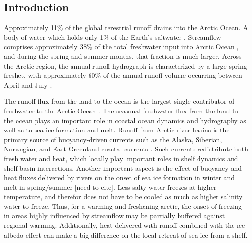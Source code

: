 \documentclass[jgrga, draft]{agutex}
\begin{document}
%

\begin{article}

%
%

\section{Introduction}

Approximately 11\% of the global terestrial runoff drains into the Arctic Ocean.
A body of water which holds only 1\% of the Earth's saltwater \citep{Lewis_2000,Lammers_2001}.
Streamflow comprises approximately 38\% of the total freshwater input into Arctic Ocean \citep{Serreze_2006}, and during the spring and summer months, that fraction is much larger.
Across the Arctic region, the annual runoff hydrograph is characterized by a large spring freshet, with approximately 60\% of the annual runoff volume occurring between April and July \citep{Lammers_2001}.

The runoff flux from the land to the ocean is the largest single contributor of freshwater to the Arctic Ocean \citep{Serreze_2006}.
The seasonal freshwater flux from the land to the ocean plays an important role in coastal ocean dynamics and hydrography \citep{Rabe_2011,Fichot_2013} as well as to sea ice formation and melt.
Runoff from Arctic river basins is the primary source of buoyancy-driven currents such as the Alaska, Siberian, Norwegian, and East Greenland coastal currents \citep[e.g.][]{Morison_2000,Boyd_2002,McGeehan_2012}.
Such currents redistribute both fresh water and heat, which locally play important roles in shelf dynamics and shelf-basin interactions.
Another important aspect is the effect of buoyancy and heat fluxes delivered by rivers on the onset of sea ice formation in winter and melt in spring/summer [need to cite].
Less salty water freezes at higher temperature, and therefor does not have to be cooled as much as higher salinity water to freeze.
Thus, for a warming and freshening arctic, the onset of freezing in areas highly influenced by streamflow may be partially buffered against regional warming.
Additionally, heat delivered with runoff combined with the ice-albedo effect can make a big difference on the local retreat of sea ice from a shelf.


\end{article}
\end{document}
